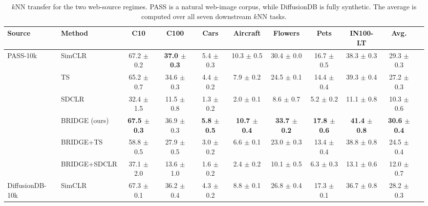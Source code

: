 \begin{table}[t]
\centering
\tiny
\setlength{\tabcolsep}{3.0pt}
\caption{$k$NN transfer for the two web-source regimes. PASS is a natural web-image corpus, while DiffusionDB is fully synthetic. The average is computed over all seven downstream $k$NN tasks.}
\label{tab:main_sota_web_sources_knn}
\begin{adjustbox}{max width=\textwidth}
\begin{tabular}{l l c c c c c c c c c}
\toprule
Source & Method & C10 & C100 & Cars & Aircraft & Flowers & Pets & IN100-LT & Avg. \\
\midrule
PASS-10k & SimCLR & 67.2 {\scriptsize$\pm$ 0.2} & \textbf{37.0 {\scriptsize$\pm$ 0.3}} & 5.4 {\scriptsize$\pm$ 0.3} & 10.3 {\scriptsize$\pm$ 0.5} & 30.4 {\scriptsize$\pm$ 0.0} & 16.7 {\scriptsize$\pm$ 0.5} & 38.3 {\scriptsize$\pm$ 0.3} & 29.3 {\scriptsize$\pm$ 0.3} \\
 & TS & 65.2 {\scriptsize$\pm$ 0.7} & 34.6 {\scriptsize$\pm$ 0.3} & 4.4 {\scriptsize$\pm$ 0.2} & 7.9 {\scriptsize$\pm$ 0.2} & 24.5 {\scriptsize$\pm$ 0.1} & 14.4 {\scriptsize$\pm$ 0.4} & 39.3 {\scriptsize$\pm$ 0.4} & 27.2 {\scriptsize$\pm$ 0.3} \\
 & SDCLR & 32.4 {\scriptsize$\pm$ 1.5} & 11.5 {\scriptsize$\pm$ 0.8} & 1.3 {\scriptsize$\pm$ 0.2} & 2.0 {\scriptsize$\pm$ 0.1} & 8.6 {\scriptsize$\pm$ 0.7} & 5.2 {\scriptsize$\pm$ 0.2} & 11.1 {\scriptsize$\pm$ 0.8} & 10.3 {\scriptsize$\pm$ 0.6} \\
\rowcolor{blue!10}  & BRIDGE (ours) & \textbf{67.5 {\scriptsize$\pm$ 0.3}} & 36.9 {\scriptsize$\pm$ 0.3} & \textbf{5.8 {\scriptsize$\pm$ 0.5}} & \textbf{10.7 {\scriptsize$\pm$ 0.4}} & \textbf{33.7 {\scriptsize$\pm$ 0.2}} & \textbf{17.8 {\scriptsize$\pm$ 0.6}} & \textbf{41.4 {\scriptsize$\pm$ 0.8}} & \textbf{30.6 {\scriptsize$\pm$ 0.4}} \\
 & BRIDGE+TS & 58.8 {\scriptsize$\pm$ 0.5} & 27.9 {\scriptsize$\pm$ 0.5} & 3.0 {\scriptsize$\pm$ 0.2} & 6.6 {\scriptsize$\pm$ 0.1} & 23.0 {\scriptsize$\pm$ 0.3} & 13.4 {\scriptsize$\pm$ 0.4} & 38.8 {\scriptsize$\pm$ 0.8} & 24.5 {\scriptsize$\pm$ 0.4} \\
 & BRIDGE+SDCLR & 37.1 {\scriptsize$\pm$ 2.0} & 13.6 {\scriptsize$\pm$ 1.0} & 1.6 {\scriptsize$\pm$ 0.2} & 2.4 {\scriptsize$\pm$ 0.2} & 10.1 {\scriptsize$\pm$ 0.5} & 6.3 {\scriptsize$\pm$ 0.3} & 13.1 {\scriptsize$\pm$ 0.6} & 12.0 {\scriptsize$\pm$ 0.7} \\
\midrule
DiffusionDB-10k & SimCLR & 67.3 {\scriptsize$\pm$ 0.1} & 36.2 {\scriptsize$\pm$ 0.4} & 4.3 {\scriptsize$\pm$ 0.2} & 8.8 {\scriptsize$\pm$ 0.1} & 26.8 {\scriptsize$\pm$ 0.4} & 17.3 {\scriptsize$\pm$ 0.1} & 36.7 {\scriptsize$\pm$ 0.8} & 28.2 {\scriptsize$\pm$ 0.3} \\

\end{tabular}
\end{adjustbox}
\end{table}
